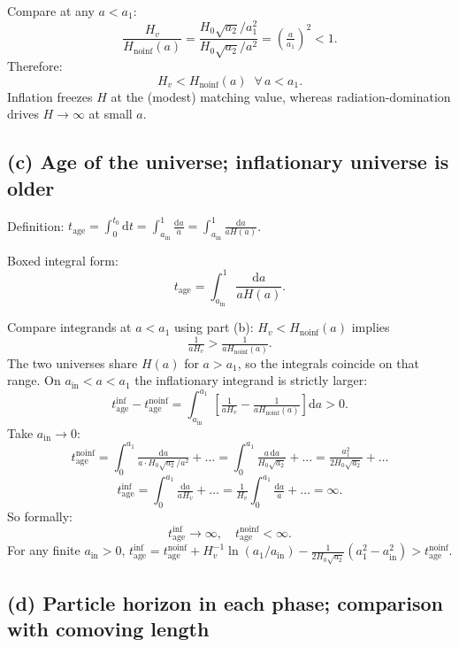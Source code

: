 \documentclass[11pt]{article}
\newcommand{\de}{\mathrm{d}}
\begin{document}
Compare at any $a<a_1$:
\[
\frac{H_v}{H_{\mathrm{noinf}}(a)} = \frac{H_0\sqrt{a_2}/a_1^2}{H_0\sqrt{a_2}/a^2} = \!\left(\tfrac{a}{a_1}\right)^{\!2} < 1.
\]
Therefore:
\[
\boxed{\;H_v < H_{\mathrm{noinf}}(a)\;\;\forall\,a<a_1.\;}
\]
Inflation freezes $H$ at the (modest) matching value, whereas radiation-domination drives $H\to\infty$ at small $a$.

\subsection*{(c) Age of the universe; inflationary universe is older}

Definition: $t_{\mathrm{age}}=\int_0^{t_0}\!\de t = \int_{a_{\mathrm{in}}}^{1}\!\frac{\de a}{\dot a}=\int_{a_{\mathrm{in}}}^{1}\!\frac{\de a}{a H(a)}$.

Boxed integral form:
\[
\boxed{\;t_{\mathrm{age}} = \int_{a_{\mathrm{in}}}^{1}\!\frac{\de a}{a H(a)}.\;}
\]

Compare integrands at $a<a_1$ using part (b): $H_v < H_{\mathrm{noinf}}(a)$ implies
\[
\tfrac{1}{a H_v} > \tfrac{1}{a H_{\mathrm{noinf}}(a)}.
\]
The two universes share $H(a)$ for $a>a_1$, so the integrals coincide on that range. On $a_{\mathrm{in}}<a<a_1$ the inflationary integrand is strictly larger:
\[
t_{\mathrm{age}}^{\mathrm{inf}} - t_{\mathrm{age}}^{\mathrm{noinf}} = \int_{a_{\mathrm{in}}}^{a_1}\!\!\left[\tfrac{1}{a H_v} - \tfrac{1}{a H_{\mathrm{noinf}}(a)}\right]\!\de a > 0.
\]
Take $a_{\mathrm{in}}\to 0$:
\[
t_{\mathrm{age}}^{\mathrm{noinf}} = \int_0^{a_1}\!\tfrac{\de a}{a\cdot H_0\sqrt{a_2}/a^2}+\dots = \int_0^{a_1}\!\tfrac{a\,\de a}{H_0\sqrt{a_2}}+\dots = \tfrac{a_1^2}{2 H_0\sqrt{a_2}}+\dots
\]
\[
t_{\mathrm{age}}^{\mathrm{inf}} = \int_0^{a_1}\!\tfrac{\de a}{a H_v}+\dots = \tfrac{1}{H_v}\!\int_0^{a_1}\!\tfrac{\de a}{a}+\dots = \infty.
\]
So formally:
\[
\boxed{\;t_{\mathrm{age}}^{\mathrm{inf}}\to\infty,\quad t_{\mathrm{age}}^{\mathrm{noinf}}<\infty.\;}
\]
For any finite $a_{\mathrm{in}}>0$, $t^{\mathrm{inf}}_{\mathrm{age}} = t^{\mathrm{noinf}}_{\mathrm{age}}+H_v^{-1}\ln(a_1/a_{\mathrm{in}})-\tfrac{1}{2 H_0\sqrt{a_2}}(a_1^2-a_{\mathrm{in}}^2)>t^{\mathrm{noinf}}_{\mathrm{age}}$.

\subsection*{(d) Particle horizon in each phase; comparison with comoving length}
\end{document}
